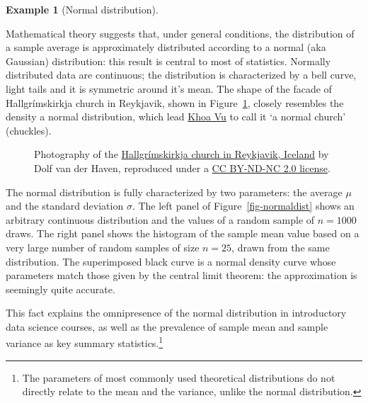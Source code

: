 \documentclass[
  11pt,
  letterpaper,
]{scrbook}
\theoremstyle{definition}
\theoremstyle{definition}
\newtheorem{example}{Example}[chapter]
\theoremstyle{remark}
\begin{document}
\begin{example}[Normal
distribution]\protect\hypertarget{exm-normaldist}{}\label{exm-normaldist}

Mathematical theory suggests that, under general conditions, the
distribution of a sample average is approximately distributed according
to a normal (aka Gaussian) distribution: this result is central to most
of statistics. Normally distributed data are continuous; the
distribution is characterized by a bell curve, light tails and it is
symmetric around it's mean. The shape of the facade of Hallgrímskirkja
church in Reykjavik, shown in Figure~\ref{fig-Hallfrimskirkja}, closely
resembles the density a normal distribution, which lead
\href{https://sites.google.com/view/khoavu-umn/home}{Khoa Vu} to call it
`a normal church' (chuckles).

\begin{figure}[ht!]


\caption{\label{fig-Hallfrimskirkja}Photography of the
\href{https://www.flickr.com/photos/dvdhaven/6350588233}{Hallgrímskirkja
church in Reykjavik, Iceland} by Dolf van der Haven, reproduced under a
\href{https://creativecommons.org/licenses/by-nc-nd/2.0/}{CC BY-ND-NC
2.0 license}.}

\end{figure}%

The normal distribution is fully characterized by two parameters: the
average \(\mu\) and the standard deviation \(\sigma\). The left panel of
Figure~\ref{fig-normaldist} shows an arbitrary continuous distribution
and the values of a random sample of \(n=1000\) draws. The right panel
shows the histogram of the sample mean value based on a very large
number of random samples of size \(n=25\), drawn from the same
distribution. The superimposed black curve is a normal density curve
whose parameters match those given by the central limit theorem: the
approximation is seemingly quite accurate.

This fact explains the omnipresence of the normal distribution in
introductory data science courses, as well as the prevalence of sample
mean and sample variance as key summary statistics.\footnote{The
  parameters of most commonly used theoretical distributions do not
  directly relate to the mean and the variance, unlike the normal
  distribution.}


\end{example}
\end{document}
